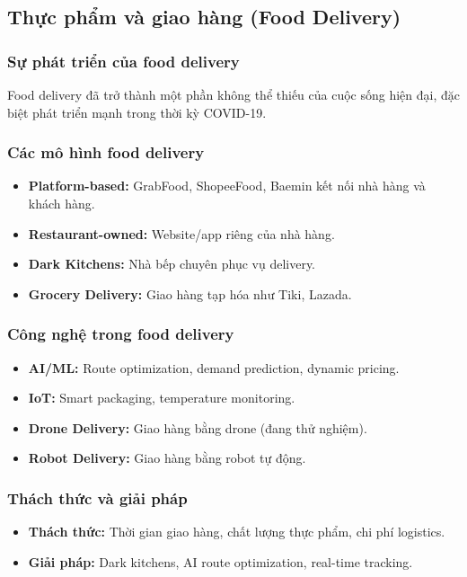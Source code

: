\documentclass[a4paper,12pt]{report}
\begin{document}
\subsection{Thực phẩm và giao hàng (Food Delivery)}

\subsubsection{Sự phát triển của food delivery}
Food delivery đã trở thành một phần không thể thiếu của cuộc sống hiện đại, đặc biệt phát triển mạnh trong thời kỳ COVID-19.

\subsubsection{Các mô hình food delivery}
\begin{itemize}
    \item \textbf{Platform-based:} GrabFood, ShopeeFood, Baemin kết nối nhà hàng và khách hàng.
    \item \textbf{Restaurant-owned:} Website/app riêng của nhà hàng.
    \item \textbf{Dark Kitchens:} Nhà bếp chuyên phục vụ delivery.
    \item \textbf{Grocery Delivery:} Giao hàng tạp hóa như Tiki, Lazada.
\end{itemize}

\subsubsection{Công nghệ trong food delivery}
\begin{itemize}
    \item \textbf{AI/ML:} Route optimization, demand prediction, dynamic pricing.
    \item \textbf{IoT:} Smart packaging, temperature monitoring.
    \item \textbf{Drone Delivery:} Giao hàng bằng drone (đang thử nghiệm).
    \item \textbf{Robot Delivery:} Giao hàng bằng robot tự động.
\end{itemize}

\subsubsection{Thách thức và giải pháp}
\begin{itemize}
    \item \textbf{Thách thức:} Thời gian giao hàng, chất lượng thực phẩm, chi phí logistics.
    \item \textbf{Giải pháp:} Dark kitchens, AI route optimization, real-time tracking.
\end{itemize}
\end{document}
